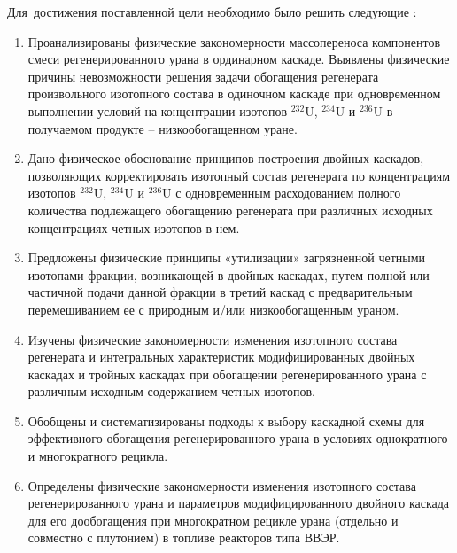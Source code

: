 Для~достижения поставленной цели необходимо было решить следующие {\tasks}:
\begin{enumerate}
  \item Проанализированы физические закономерности массопереноса компонентов смеси
  регенерированного урана в ординарном каскаде. Выявлены физические причины
  невозможности решения задачи обогащения регенерата произвольного изотопного
  состава в одиночном каскаде при одновременном выполнении условий на
  концентрации изотопов $^{232}$U, $^{234}$U и $^{236}$U в получаемом продукте – низкообогащенном уране.
  \item Дано физическое обоснование принципов построения двойных каскадов,
  позволяющих корректировать изотопный состав регенерата по концентрациям
  изотопов $^{232}$U, $^{234}$U и $^{236}$U с одновременным расходованием полного количества
  подлежащего обогащению регенерата при различных исходных концентрациях
  четных изотопов в нем.
  \item Предложены физические принципы «утилизации» загрязненной четными
  изотопами фракции, возникающей в двойных каскадах, путем полной или
  частичной подачи данной фракции в третий каскад с предварительным
  перемешиванием ее с природным и/или низкообогащенным ураном.
  \item Изучены физические закономерности изменения изотопного состава регенерата и
  интегральных характеристик модифицированных двойных каскадах и тройных
  каскадах при обогащении регенерированного урана с различным исходным
  содержанием четных изотопов.
  \item Обобщены и систематизированы подходы к выбору каскадной схемы для
  эффективного обогащения регенерированного урана в условиях однократного и
  многократного рецикла.
  \item Определены физические закономерности изменения изотопного состава
  регенерированного урана и параметров модифицированного двойного каскада для
  его дообогащения при многократном рецикле урана (отдельно и совместно с
  плутонием) в топливе реакторов типа ВВЭР.
\end{enumerate}


